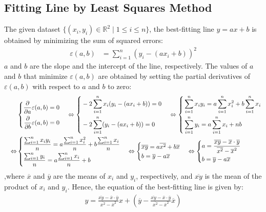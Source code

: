 \documentclass{article}
\begin{document}
\subsection{Fitting Line by Least Squares Method}
The given dataset \(\{(x_i,y_i)\in\mathbb{R}^2\mid 1\leq i\leq n\}\),
the best-fitting line \(y = ax + b\) is obtained by minimizing the sum of squared errors:
\begin{align}
	\varepsilon(a,b) & = \sum_{i=1}^{n} (y_i - (ax_i + b))^2
\end{align}
\(a\) and \(b\) are the slope and the intercept of the line, respectively.
The values of \(a\) and \(b\) that minimize \(\varepsilon(a,b)\) are obtained by setting the partial derivatives of \(\varepsilon(a,b)\) with respect to \(a\) and \(b\) to zero:
\begin{align}
	 & \left\{
	\begin{aligned}
		\frac{\partial}{\partial a}\varepsilon(a,b) & = 0 \\
		\frac{\partial}{\partial b}\varepsilon(a,b) & = 0
	\end{aligned}
	\right.
	\quad\Leftrightarrow
	\left\{
	\begin{aligned}
		 & -2\sum_{i=1}^{n} x_i(y_i - (ax_i + b)) = 0 \\
		 & -2\sum_{i=1}^{n} (y_i - (ax_i + b))    = 0
	\end{aligned}
	\right.
	\quad\Leftrightarrow
	\left\{
	\begin{aligned}
		 & \sum_{i=1}^{n} x_iy_i = a\sum_{i=1}^{n} x_i^2 + b\sum_{i=1}^{n} x_i \\
		 & \sum_{i=1}^{n} y_i = a\sum_{i=1}^{n} x_i + nb
	\end{aligned}
	\right.               \notag \\
	\quad\Leftrightarrow
	 & \left\{
	\begin{aligned}
		 & \frac{\sum_{i=1}^{n}x_iy_i}{n} = a\frac{\sum_{i=1}^{n}x_i^2}{n} + b\frac{\sum_{i=1}^{n}x_i}{n} \\
		 & \frac{\sum_{i=1}^{n}y_i}{n} = a\frac{\sum_{i=1}^{n}x_i}{n} + b
	\end{aligned}
	\right.
	\quad\Leftrightarrow
	\left\{
	\begin{aligned}
		 & \overline{xy} = a\overline{x^2} + b\overline{x} \\
		 & b = \overline{y} - a\overline{x}
	\end{aligned}
	\right.
	\quad\Leftrightarrow
	\left\{
	\begin{aligned}
		 & a = \frac{\overline{xy} - \overline{x}\cdot\overline{y}}{\overline{x^2} - \overline{x}^2} \\
		 & b = \overline{y} - a\overline{x}
	\end{aligned}
	\right.
\end{align}
,where \(\overline{x}\) and \(\overline{y}\) are the means of \(x_i\) and \(y_i\), respectively, and \(\overline{xy}\) is the mean of the product of \(x_i\) and \(y_i\).
Hence, the equation of the best-fitting line is given by:
\begin{align}
	y = \frac{\overline{xy} - \overline{x}\cdot\overline{y}}{\overline{x^2} - \overline{x}^2}x + \left(\overline{y} - \frac{\overline{xy} - \overline{x}\cdot\overline{y}}{\overline{x^2} - \overline{x}^2}\overline{x}\right)
\end{align}
\end{document}
